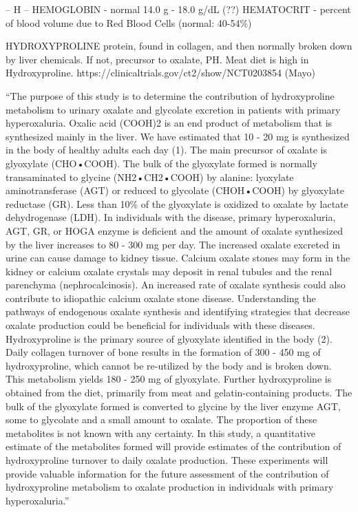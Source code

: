-- H -- HEMOGLOBIN - normal 14.0 g - 18.0 g/dL (??) HEMATOCRIT - percent
of blood volume due to Red Blood Cells (normal: 40-54\%)

HYDROXYPROLINE protein, found in collagen, and then normally broken down
by liver chemicals. If not, precursor to oxalate, PH. Meat diet is high
in Hydroxyproline. https://clinicaltrials.gov/ct2/show/NCT0203854 (Mayo)

``The purpose of this study is to determine the contribution of
hydroxyproline metabolism to urinary oxalate and glycolate excretion in
patients with primary hyperoxaluria. Oxalic acid (COOH)2 is an end
product of metabolism that is synthesized mainly in the liver. We have
estimated that 10 - 20 mg is synthesized in the body of healthy adults
each day (1). The main precursor of oxalate is glyoxylate (CHO•COOH).
The bulk of the glyoxylate formed is normally transaminated to glycine
(NH2•CH2•COOH) by alanine: lyoxylate aminotransferase (AGT) or reduced
to glycolate (CHOH•COOH) by glyoxylate reductase (GR). Less than 10\% of
the glyoxylate is oxidized to oxalate by lactate dehydrogenase (LDH). In
individuals with the disease, primary hyperoxaluria, AGT, GR, or HOGA
enzyme is deficient and the amount of oxalate synthesized by the liver
increases to 80 - 300 mg per day. The increased oxalate excreted in
urine can cause damage to kidney tissue. Calcium oxalate stones may form
in the kidney or calcium oxalate crystals may deposit in renal tubules
and the renal parenchyma (nephrocalcinosis). An increased rate of
oxalate synthesis could also contribute to idiopathic calcium oxalate
stone disease. Understanding the pathways of endogenous oxalate
synthesis and identifying strategies that decrease oxalate production
could be beneficial for individuals with these diseases. Hydroxyproline
is the primary source of glyoxylate identified in the body (2). Daily
collagen turnover of bone results in the formation of 300 - 450 mg of
hydroxyproline, which cannot be re-utilized by the body and is broken
down. This metabolism yields 180 - 250 mg of glyoxylate. Further
hydroxyproline is obtained from the diet, primarily from meat and
gelatin-containing products. The bulk of the glyoxylate formed is
converted to glycine by the liver enzyme AGT, some to glycolate and a
small amount to oxalate. The proportion of these metabolites is not
known with any certainty. In this study, a quantitative estimate of the
metabolites formed will provide estimates of the contribution of
hydroxyproline turnover to daily oxalate production. These experiments
will provide valuable information for the future assessment of the
contribution of hydroxyproline metabolism to oxalate production in
individuals with primary hyperoxaluria.''

